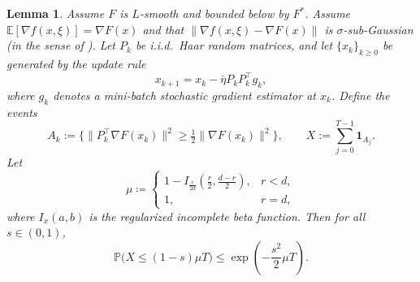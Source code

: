 \documentclass[10pt]{article}
\newtheorem{lemma}[lemma]{Lemma}
\begin{document}
\begin{lemma}\label{lem:martingale-cher}
Assume $F$ is $L$-smooth and bounded below by $F^\ast$.
Assume $\mathbb{E}[\nabla f(x,\xi)]=\nabla F(x)$ and that
$\|\nabla f(x,\xi)-\nabla F(x)\|$ is $\sigma$-sub-Gaussian (in the sense of ).
Let $P_k$ be i.i.d.\ Haar random matrices, and let $\{x_k\}_{k\ge 0}$ be generated by the update rule
\[
x_{k+1}=x_k-\bar{\eta} P_kP_k^\top g_k,
\]
where $g_k$ denotes a mini-batch stochastic gradient estimator at $x_k$.
Define the events
\[
A_k := \Big\{\|P_k^\top \nabla F(x_k)\|^2 \ge \tfrac{1}{2}\|\nabla F(x_k)\|^2\Big\},
\qquad
X:=\sum_{j=0}^{T-1}\mathbf{1}_{A_j}.
\]
Let
\[
\mu \coloneqq
\begin{cases}
1 - I_{\frac{r}{2d}}\!\left(\frac{r}{2}, \frac{d-r}{2}\right), & r<d,\\
1, & r=d,
\end{cases}
\]
where $I_{x}(a,b)$ is the regularized incomplete beta function.
Then for all $s\in(0,1)$,
\[
\mathbb{P}\big(X\le (1-s)\mu T\big)\le \exp\!\left(-\frac{s^2}{2}\mu T\right).
\]
\end{lemma}
\end{document}

